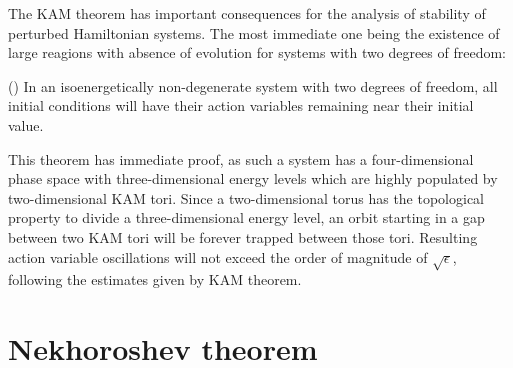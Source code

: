 The KAM theorem has important consequences for the analysis of stability of perturbed Hamiltonian systems. The most immediate one being the existence of large reagions with absence of evolution for systems with two degrees of freedom:
\begin{theorem}(\cite{})
    In an isoenergetically non-degenerate system with two degrees of freedom, all initial conditions will have their action variables remaining near their initial value.
\end{theorem} 
This theorem has immediate proof, as such a system has a four-dimensional phase space with three-dimensional energy levels which are highly populated by two-dimensional KAM tori. Since a two-dimensional torus has the topological property to divide a three-dimensional energy level, an orbit starting in a gap between two KAM tori will be forever trapped between those tori. Resulting action variable oscillations will not exceed the order of magnitude of $\sqrt{\epsilon}$, following the estimates given by KAM theorem. 


\section{Nekhoroshev theorem}\label{sec:1:nekhoroshev}


